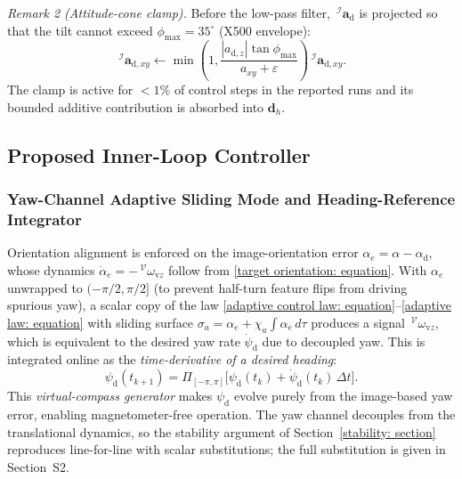\textit{Remark 2 (Attitude-cone clamp).} Before the low-pass filter, $\,^\mathcal{I}\boldsymbol{a}_\text{d}$ is projected so that the tilt cannot exceed $\phi_{\max}=35^\circ$ (X500 envelope):
\begin{equation} \label{cone clamp: equation}
    \,^\mathcal{I}\boldsymbol{a}_{\text{d},xy}\leftarrow\min\!\left(1,\frac{|a_{\text{d},z}|\tan\phi_{\max}}{a_{xy}+\varepsilon}\right)\!\,^\mathcal{I}\boldsymbol{a}_{\text{d},xy}.
\end{equation}
The clamp is active for $<1\%$ of control steps in the reported runs and its bounded additive contribution is absorbed into $\boldsymbol{d}_h$.

\subsection{Proposed Inner-Loop Controller} \label{inner loop: section}

\subsubsection{Yaw-Channel Adaptive Sliding Mode and Heading-Reference Integrator}
Orientation alignment is enforced on the image-orientation error $\alpha_e=\alpha-\alpha_\text{d}$, whose dynamics $\dot{\alpha}_e=-\,^\mathcal{V}\omega_{\text{v}z}$ follow from \eqref{target orientation: equation}. With $\alpha_e$ unwrapped to $(-\pi/2,\pi/2]$ (to prevent half-turn feature flips from driving spurious yaw), a scalar copy of the law \eqref{adaptive control law: equation}--\eqref{adaptive law: equation} with sliding surface $\sigma_a=\alpha_e+\chi_a\!\int\alpha_e\,d\tau$ produces a signal $\,^\mathcal{V}\omega_{\text{v}z}$, which is equivalent to the desired yaw rate $\dot{\psi}_\text{d}$ due to decoupled yaw. This is integrated online as the \emph{time-derivative of a desired heading}:
\begin{equation} \label{psi d integrator: equation}
    \psi_\text{d}(t_{k+1}) = \Pi_{[-\pi,\pi]}\!\big[\psi_\text{d}(t_k) + \dot{\psi}_\text{d}(t_k)\,\Delta t\big].
\end{equation}
This \emph{virtual-compass generator} makes $\psi_\text{d}$ evolve purely from the image-based yaw error, enabling magnetometer-free operation. The yaw channel decouples from the translational dynamics, so the stability argument of Section~\ref{stability: section} reproduces line-for-line with scalar substitutions; the full substitution is given in Section~S2.

